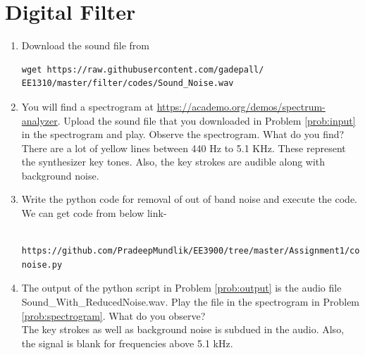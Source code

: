 \documentclass[journal,12pt,twocolumn]{IEEEtran}
\renewcommand\thesection{\arabic{section}}
\begin{document}
\section{Digital Filter}
\begin{enumerate}[label=\thesection.\arabic*
,ref=\thesection.\theenumi]
\item
\label{prob:input}
Download the sound file from  
\begin{lstlisting}
wget https://raw.githubusercontent.com/gadepall/ 
EE1310/master/filter/codes/Sound_Noise.wav
\end{lstlisting}
\item
\label{prob:spectrogram}
You will find a spectrogram at \href{https://academo.org/demos/spectrum-analyzer}{\url{https://academo.org/demos/spectrum-analyzer}}. 
%
Upload the sound file that you downloaded in Problem \ref{prob:input} in the spectrogram  and play.  Observe the spectrogram. What do you find?
\\
%
\solution There are a lot of yellow lines between 440 Hz to 5.1 KHz.  These represent the synthesizer key tones. Also, the key strokes
are audible along with background noise.
\item
\label{prob:output}
Write the python code for removal of out of band noise and execute the code.
\\
\solution
We can get code from below link-
\begin{lstlisting}
     https://github.com/PradeepMundlik/EE3900/tree/master/Assignment1/codes/q2/Cancel-noise.py
\end{lstlisting}
% 

%
\item
The output of the python script in Problem \ref{prob:output} is the audio file Sound\_With\_ReducedNoise.wav. Play the file in the spectrogram in Problem \ref{prob:spectrogram}. What do you observe?
\\
\solution The key strokes as well as background noise is subdued in the audio.  Also,  the signal is blank for frequencies above 5.1 kHz.
\end{enumerate}
\end{document}
